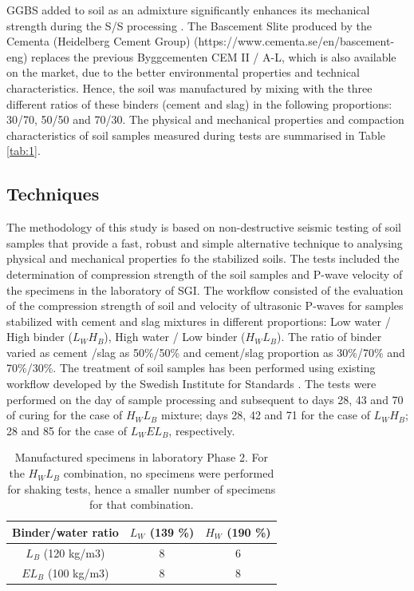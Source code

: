 \documentclass[10pt,twoside,twocolumn,a4paper]{article}
\begin{document}
GGBS added to soil as an admixture significantly enhances its mechanical strength during the S/S processing \cite{Wangetal2020}. The Bascement Slite produced by the Cementa  (Heidelberg Cement Group) (https://www.cementa.se/en/bascement-eng) replaces the previous Byggcementen CEM II / A-L, which is also available on the market, due to the better environmental properties and technical characteristics. Hence, the soil was manufactured by mixing with the three different ratios of these binders (cement and slag) in the following proportions: 30/70, 50/50 and 70/30. The physical and mechanical properties and compaction characteristics of soil samples measured during tests are summarised in Table \ref{tab:1}.  

\subsection{Techniques}
The methodology of this study is based on non-destructive seismic testing of soil samples that provide a fast, robust and simple alternative technique to analysing physical and mechanical properties fo the stabilized soils. The tests included the determination of compression strength of the soil samples and P-wave velocity of the specimens in the laboratory of SGI. The workflow consisted of the evaluation of the compression strength of soil and velocity of ultrasonic P-waves for samples stabilized with cement and slag mixtures in different proportions: Low water / High binder ($L_WH_B$), High water / Low binder ($H_WL_B$). The ratio of binder varied as cement /slag as 50\%/50\% and cement/slag proportion as 30\%/70\% and 70\%/30\%. The treatment of soil samples has been performed using existing workflow developed by the Swedish Institute for Standards \cite{SIS2018b}. The tests were performed on the day of sample processing and subsequent to days 28, 43 and 70 of curing for the case of $H_WL_B$ mixture; days 28, 42 and 71 for the case of $L_WH_B$; 28 and 85 for the case of $L_WEL_B$, respectively. 

\begin{table}
\caption{Manufactured specimens in laboratory Phase 2. For the $H_WL_B$ combination, no specimens were performed for shaking tests, hence a smaller number of specimens for that combination. }
\label{tab:2}
\smallskip 
\begin{tabular*}{\columnwidth}{@{\extracolsep{\fill}}ccc}
\toprule
Binder/water ratio  & $L_W$ (139 \%) & $H_W$ (190 \%)  \\
\toprule
$L_B$ (120 kg/m3) & 8 & 6 \\ 
\hline
$EL_B$ (100 kg/m3) & 8 & 8 \\
\midrule
\bottomrule
\end{tabular*}
\end{table}
\end{document}
